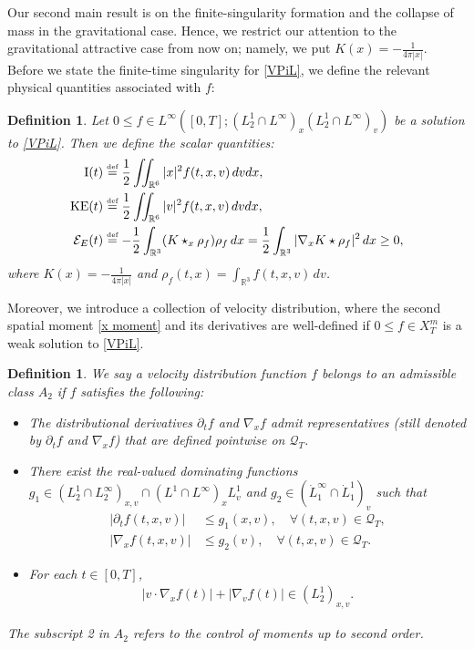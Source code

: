 \documentclass[reqno,11pt,final]{amsart}
\theoremstyle{plain}
\newtheorem{definition}[theorem]{Definition}
\numberwithin{equation}{section}
\numberwithin{theorem}{section}
\newcommand{\eqdef }{\overset{\mbox{\tiny{def}}}{=}}
\begin{document}
Our second main result is on the finite-singularity formation and the collapse of mass in the gravitational case. Hence, we restrict our attention to the gravitational attractive case from now on; namely, we put $K(x) = -\frac{1}{4\pi|x|}$. Before we state the finite-time singularity for \eqref{VPiL}, we define the relevant physical quantities associated with $f$:
\begin{definition}\label{phys quantity}
    Let $0\le f\in L^\infty([0,T]; (L^1_2\cap L^\infty)_{x}(L^1_2\cap L^\infty)_v)$ be a solution to \eqref{VPiL}. Then we define the scalar quantities:
    \begin{align}\label{x moment}
        \textup{I}(t) &\eqdef \frac{1}{2} \iint_{\mathbb{R}^6} |x|^2f(t,x,v)\,dvdx,\\
        \textup{KE}(t) &\eqdef \frac{1}{2} \iint_{\mathbb{R}^6} |v|^2f(t,x,v)\,dvdx,\label{tot kin energy}\\
        \mathcal{E}_E(t) &\eqdef -\frac{1}{2} \int_{\mathbb{R}^3} (K\star_x\rho_f)\rho_f\,dx = \frac{1}{2}\int_{\mathbb{R}^3} |\nabla_xK\star\rho_f|^2\,dx\ge0,\label{tot E energy}
    \end{align}where $K(x) = -\frac{1}{4\pi|x|}$ and $\rho_f(t,x) = \int_{\mathbb{R}^3}f(t,x,v)\,dv$.
\end{definition}

Moreover, we introduce a collection of velocity distribution, where the second spatial moment \eqref{x moment} and its derivatives are well-defined if $0\le f\in X_T^m$ is a weak solution to \eqref{VPiL}.

\begin{definition}\label{adm class}
    We say a velocity distribution function $f$ belongs to an admissible class $A_2$ if $f$ satisfies the following:
    \begin{itemize}
        \item The distributional derivatives $\partial_t f$ and $\nabla_x f$ admit representatives (still denoted by $\partial_t f$ and $\nabla_x f$) that are defined pointwise on $\mathcal Q_T$.
        \item There exist the real-valued dominating functions $g_1\in (L^1_2\cap L_2^\infty)_{x,v}\cap (L^1\cap L^\infty)_xL^1_v$ and $g_2\in (\dot{L}_1^\infty\cap \dot{L}^1_1)_v$ such that
        \begin{align}
            |\partial_tf(t,x,v)| &\le g_1(x,v), \quad \forall (t,x,v)\in\mathcal{Q}_T,\label{Dtf dom}\\
            |\nabla_xf(t,x,v)| &\le g_2(v), \quad\forall (t,x,v)\in\mathcal{Q}_T.\label{Dxf dom}
        \end{align}
        \item For each $t\in[0,T]$,
        \begin{align}
            |v\cdot\nabla_xf(t)| + |\nabla_vf(t)| \in (L^1_2)_{x,v}.\label{vDxf Dvf L1w}
        \end{align}
    \end{itemize}The subscript 2 in $A_2$ refers to the control of moments up to second order. 
\end{definition}
\end{document}
